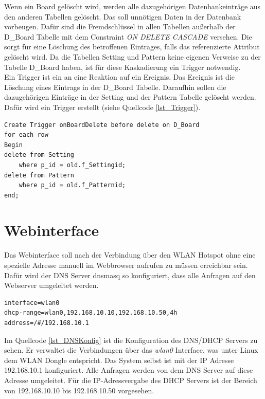 Wenn ein Board gelöscht wird, werden alle dazugehörigen Datenbankeinträge aus den anderen Tabellen gelöscht. Das soll unnötigen Daten in der Datenbank vorbeugen. Dafür sind die Fremdschlüssel in allen Tabellen außerhalb der D\_Board Tabelle mit dem Constraint \textit{ON DELETE CASCADE} versehen. Die sorgt für eine Löschung des betroffenen Eintrages, falls das referenzierte Attribut gelöscht wird. Da die Tabellen Setting und Pattern keine eigenen Verweise zu der Tabelle D\_Board haben, ist für diese Kaskadierung ein Trigger notwendig. \\
Ein Trigger ist ein an eine Reaktion auf ein Ereignis. Das Ereignis ist die Löschung eines Eintrags in der D\_Board Tabelle. Daraufhin sollen die dazugehörigen Einträge in der Setting und der Pattern Tabelle gelöscht werden. Dafür wird ein Trigger erstellt (siehe Quellcode \ref{lst_Trigger}).\\

\begin{lstlisting}[caption={onBoardDelete Trigger},label=lst_Trigger]
Create Trigger onBoardDelete before delete on D_Board 
for each row 
Begin 
delete from Setting 
	where p_id = old.f_Settingid;
delete from Pattern 
	where p_id = old.f_Patternid;
end;
\end{lstlisting}



\newpage
\section{Webinterface}
Das Webinterface soll nach der Verbindung über den WLAN Hotspot ohne eine spezielle Adresse manuell im Webbrowser aufrufen zu müssen erreichbar sein. Dafür wird der DNS Server dnsmasq so konfiguriert, dass alle Anfragen auf den Webserver umgeleitet werden.

\begin{lstlisting}[caption={DHCP/DNS Konfiguration},label=lst_DNSKonfig]
interface=wlan0
dhcp-range=wlan0,192.168.10.10,192.168.10.50,4h
address=/#/192.168.10.1
\end{lstlisting}

Im Quellcode \ref{lst_DNSKonfig} ist die Konfiguration des DNS/DHCP Servers zu sehen. Er verwaltet die Verbindungen über das \textit{wlan0} Interface, was unter Linux dem WLAN Dongle entspricht. Das System selbst ist mit der IP Adresse 192.168.10.1 konfiguriert. Alle Anfragen werden von dem DNS Server auf diese Adresse umgeleitet. Für die IP-Adressvergabe des DHCP Servers ist der Bereich von 192.168.10.10 bis 192.168.10.50 vorgesehen. 


